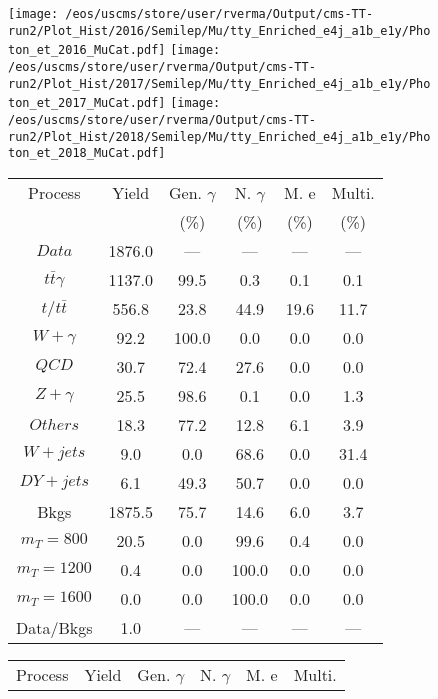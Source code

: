 \begin{figure}
\centering
\texttt{[image: /eos/uscms/store/user/rverma/Output/cms-TT-run2/Plot\_Hist/2016/Semilep/Mu/tty\_Enriched\_e4j\_a1b\_e1y/Photon\_et\_2016\_MuCat.pdf]}
\texttt{[image: /eos/uscms/store/user/rverma/Output/cms-TT-run2/Plot\_Hist/2017/Semilep/Mu/tty\_Enriched\_e4j\_a1b\_e1y/Photon\_et\_2017\_MuCat.pdf]}
\texttt{[image: /eos/uscms/store/user/rverma/Output/cms-TT-run2/Plot\_Hist/2018/Semilep/Mu/tty\_Enriched\_e4j\_a1b\_e1y/Photon\_et\_2018\_MuCat.pdf]}
\begin{minipage}[c]{0.32\textwidth}
\centering
\tiny{
\begin{tabular}{cccccc}
\hline
Process & Yield & Gen. $\gamma$ & N. $\gamma$ & M. e & Multi. \\
 &  & (\%) & (\%) & (\%) & (\%)  \\
\hline
                                                                      $ Data $ &  1876.0 &  --- &  --- &  --- &  ---\\
$ t\bar{t}\gamma $ &  1137.0 &  99.5 &  0.3 &  0.1 &  0.1\\
$ t/t\bar{t} $ &  556.8 &  23.8 &  44.9 &  19.6 &  11.7\\
$ W+\gamma $ &  92.2 &  100.0 &  0.0 &  0.0 &  0.0\\
$ QCD $ &  30.7 &  72.4 &  27.6 &  0.0 &  0.0\\
$ Z+\gamma $ &  25.5 &  98.6 &  0.1 &  0.0 &  1.3\\
$ Others $ &  18.3 &  77.2 &  12.8 &  6.1 &  3.9\\
$ W+jets $ &  9.0 &  0.0 &  68.6 &  0.0 &  31.4\\
$ DY+jets $ &  6.1 &  49.3 &  50.7 &  0.0 &  0.0\\
Bkgs &  1875.5 &  75.7 &  14.6 &  6.0 &  3.7\\
$ m_{T} = 800 $ &  20.5 &  0.0 &  99.6 &  0.4 &  0.0\\
$ m_{T} = 1200 $ &  0.4 &  0.0 &  100.0 &  0.0 &  0.0\\
$ m_{T} = 1600 $ &  0.0 &  0.0 &  100.0 &  0.0 &  0.0\\
Data/Bkgs &  1.0 &  --- &  --- &  --- &  ---\\
\hline
\end{tabular}
}
\end{minipage}
\begin{minipage}[c]{0.32\textwidth}
\centering
\tiny{
\begin{tabular}{cccccc}
\hline
Process & Yield & Gen. $\gamma$ & N. $\gamma$ & M. e & Multi. \\

\end{tabular}}
\end{minipage}
\end{figure}
